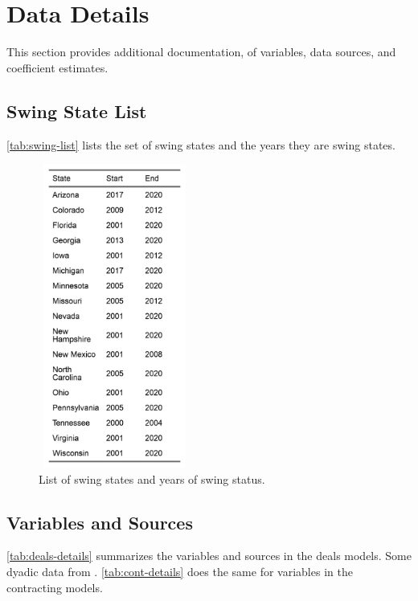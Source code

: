 \documentclass[12pt]{article}
\begin{document}
\newpage



\section{Data Details}
\afterpage{\clearpage}
This section provides additional documentation, of variables, data sources, and coefficient estimates.  

\subsection{Swing State List}

\autoref{tab:swing-list} lists the set of swing states and the years they are swing states.
\begin{figure}[htpb]
	\centering
		\includegraphics[width=5cm, height=10cm,keepaspectratio]{swing-list.png}
	\caption{List of swing states and years of swing status.}
	\label{tab:swing-list}
\end{figure}



\subsection{Variables and Sources}

\autoref{tab:deals-details} summarizes the variables and sources in the deals models. Some dyadic data from \citet{peacesciencer-package}. 
\autoref{tab:cont-details} does the same for variables in the contracting models. 
\end{document}
